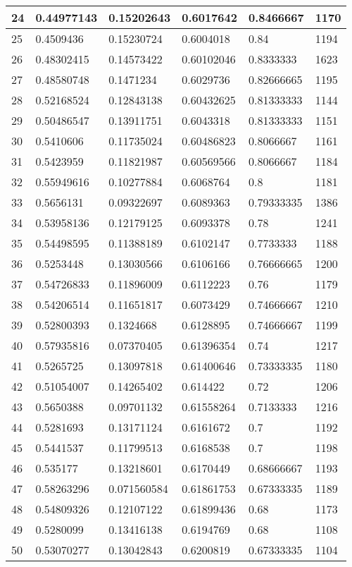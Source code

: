 \begin{longtable}{|l|l|l|l|l|l|}
24 & 0.44977143 & 0.15202643 & 0.6017642 & 0.8466667 & 1170 \\ \hline 
25 & 0.4509436 & 0.15230724 & 0.6004018 & 0.84 & 1194 \\ \hline 
26 & 0.48302415 & 0.14573422 & 0.60102046 & 0.8333333 & 1623 \\ \hline 
27 & 0.48580748 & 0.1471234 & 0.6029736 & 0.82666665 & 1195 \\ \hline 
28 & 0.52168524 & 0.12843138 & 0.60432625 & 0.81333333 & 1144 \\ \hline 
29 & 0.50486547 & 0.13911751 & 0.6043318 & 0.81333333 & 1151 \\ \hline 
30 & 0.5410606 & 0.11735024 & 0.60486823 & 0.8066667 & 1161 \\ \hline 
31 & 0.5423959 & 0.11821987 & 0.60569566 & 0.8066667 & 1184 \\ \hline 
32 & 0.55949616 & 0.10277884 & 0.6068764 & 0.8 & 1181 \\ \hline 
33 & 0.5656131 & 0.09322697 & 0.6089363 & 0.79333335 & 1386 \\ \hline 
34 & 0.53958136 & 0.12179125 & 0.6093378 & 0.78 & 1241 \\ \hline 
35 & 0.54498595 & 0.11388189 & 0.6102147 & 0.7733333 & 1188 \\ \hline 
36 & 0.5253448 & 0.13030566 & 0.6106166 & 0.76666665 & 1200 \\ \hline 
37 & 0.54726833 & 0.11896009 & 0.6112223 & 0.76 & 1179 \\ \hline 
38 & 0.54206514 & 0.11651817 & 0.6073429 & 0.74666667 & 1210 \\ \hline 
39 & 0.52800393 & 0.1324668 & 0.6128895 & 0.74666667 & 1199 \\ \hline 
40 & 0.57935816 & 0.07370405 & 0.61396354 & 0.74 & 1217 \\ \hline 
41 & 0.5265725 & 0.13097818 & 0.61400646 & 0.73333335 & 1180 \\ \hline 
42 & 0.51054007 & 0.14265402 & 0.614422 & 0.72 & 1206 \\ \hline 
43 & 0.5650388 & 0.09701132 & 0.61558264 & 0.7133333 & 1216 \\ \hline 
44 & 0.5281693 & 0.13171124 & 0.6161672 & 0.7 & 1192 \\ \hline 
45 & 0.5441537 & 0.11799513 & 0.6168538 & 0.7 & 1198 \\ \hline 
46 & 0.535177 & 0.13218601 & 0.6170449 & 0.68666667 & 1193 \\ \hline 
47 & 0.58263296 & 0.071560584 & 0.61861753 & 0.67333335 & 1189 \\ \hline 
48 & 0.54809326 & 0.12107122 & 0.61899436 & 0.68 & 1173 \\ \hline 
49 & 0.5280099 & 0.13416138 & 0.6194769 & 0.68 & 1108 \\ \hline 
50 & 0.53070277 & 0.13042843 & 0.6200819 & 0.67333335 & 1104 \\ \hline 
\end{longtable}